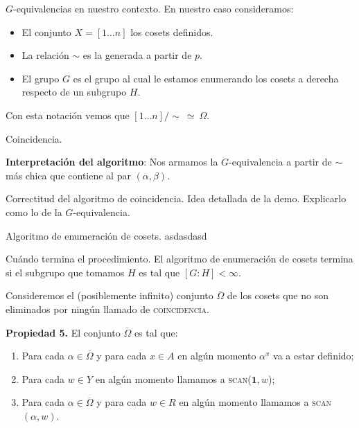 \documentclass[aspectratio=169, 9pt]{beamer}
\newcommand{\coin}{\textsc{coincidencia}}
\newcommand{\scan}{\textsc{scan}}
\newcommand{\In}{[1 \dots n]}
\newcommand{\ol}{\overline}
\begin{document}
\begin{frame}[fragile]{$G$-equivalencias en nuestro contexto.}
	En nuestro caso consideramos:
	\begin{itemize}
		\item El conjunto $X = \In$ los cosets definidos.
		\pause
		\item La relación $\sim$ es la generada a partir de $p$.
		\pause
		\item El grupo $G$ es el grupo al cual le estamos enumerando los cosets a derecha respecto de un subgrupo $H$.
		\pause 
	\end{itemize}

\pause

Con esta notación vemos que $\In /\sim \ \simeq \ \Omega$.
\end{frame}

\begin{frame}[fragile]{Coincidencia.}
	
	
	\textbf{Interpretación del algoritmo}:
	Nos armamos la $G$-equivalencia a partir de $\sim$ más chica que contiene al par $(\alpha, \beta)$.
	
\end{frame}


\begin{frame}[fragile]{Correctitud del algoritmo de coincidencia.}
	Idea detallada de la demo. Explicarlo como lo de la $G$-equivalencia.
\end{frame}



\begin{frame}[fragile]{Algoritmo de enumeración de cosets.}
asdasdasd
\end{frame}




\begin{frame}[fragile]{Cuándo termina el procedimiento.}
	El algoritmo de enumeración de cosets termina si el subgrupo que tomamos $H$ es tal que $[G:H] < \infty$.
	\pause
	
	
	Consideremos el (posiblemente infinito) conjunto $\ol \Omega$ de los cosets que no son eliminados por ningún llamado de \coin.

	\pause
	
	
	
	
	\textbf{Propiedad 5.} El conjunto $\ol \Omega$ es tal que:
	\begin{enumerate}
		\item Para cada $\alpha \in \overline \Omega$ y para cada $x \in A$ en algún momento $\alpha^x$ va a estar definido;
		\item Para cada $w \in Y$ en algún momento llamamos a \scan($\textbf{1},w$);
		\item Para cada $\alpha \in \ol \Omega$ y para cada $w \in R$ en algún momento llamamos a \scan$(\alpha, w)$.
	\end{enumerate}
\end{frame}
\end{document}
